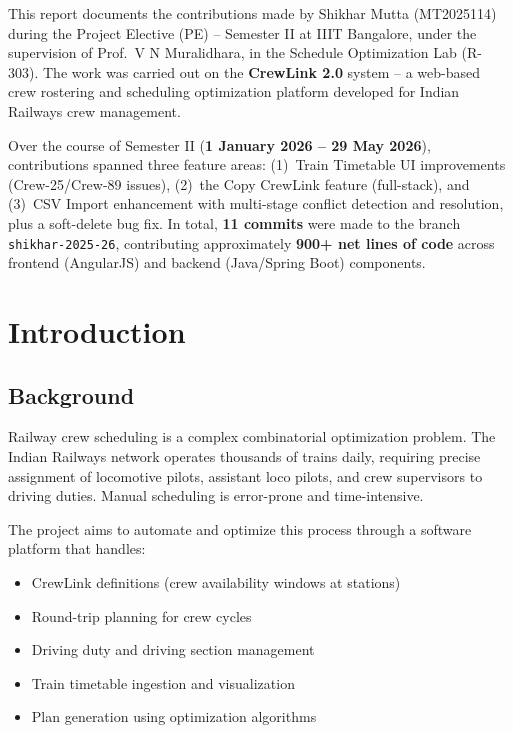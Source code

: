 \documentclass[12pt,a4paper]{article}
\begin{document}
This report documents the contributions made by Shikhar Mutta (MT2025114)
during the Project Elective (PE) -- Semester II at IIIT Bangalore, under the
supervision of Prof.\ V N Muralidhara, in the Schedule Optimization Lab
(R-303). The work was carried out on the \textbf{CrewLink 2.0} system -- a
web-based crew rostering and scheduling optimization platform developed for
Indian Railways crew management.

Over the course of Semester II (\textbf{1 January 2026 -- 29 May 2026}),
contributions spanned three feature areas: (1)~Train Timetable UI improvements
(Crew-25/Crew-89 issues), (2)~the Copy CrewLink feature (full-stack), and
(3)~CSV Import enhancement with multi-stage conflict detection and resolution,
plus a soft-delete bug fix. In total, \textbf{11 commits} were made to the
branch \texttt{shikhar-2025-26}, contributing approximately \textbf{900+ net
lines of code} across frontend (AngularJS) and backend (Java/Spring Boot)
components.

\section{Introduction}

\subsection{Background}

Railway crew scheduling is a complex combinatorial optimization problem.
The Indian Railways network operates thousands of trains daily, requiring
precise assignment of locomotive pilots, assistant loco pilots, and crew
supervisors to driving duties. Manual scheduling is error-prone and
time-intensive.

The project aims to automate and optimize this process through a software platform
that handles:
\begin{itemize}[leftmargin=1.5em]
    \item CrewLink definitions (crew availability windows at stations)
    \item Round-trip planning for crew cycles
    \item Driving duty and driving section management
    \item Train timetable ingestion and visualization
    \item Plan generation using optimization algorithms
\end{itemize}
\end{document}
